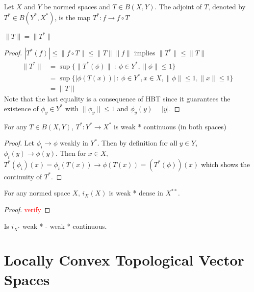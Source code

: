 
\begin{definition}
  Let $X$ and $Y$ be normed spaces and $T \in B(X, Y)$. The adjoint
  of $T$, denoted by $T^{*} \in B(Y^{*}, X^{*})$, is the map $T^{*}:
  f \to f\circ T$
\end{definition}

\begin{proposition}
  $\|T\| = \|T^*\|$
\end{proposition}
\begin{proof}
  $|T^*(f)| \le \|f \circ T\| \le \|T\|\|f\|$ implies $ \|T^{*}\| \le \|T\|$
  \begin{align*}
    \|T^*\| & = \sup \{ \|T^{*}(\phi)\| \ : \ \phi \in Y^*, \|\phi\| \le 1 \} \\
    &= \sup \{ |\phi(T(x))| \ : \ \phi \in Y^*, x \in X, \|\phi\| \le
    1, \|x\| \le 1 \} \\
    &= \|T\|
  \end{align*}
  Note that the last equality is a consequence of HBT since it
  guarantees the existence of $\phi_y \in Y^*$ with $\|\phi_y\|\le 1$
  and $\phi_y(y) = |y|$.
\end{proof}

\begin{lemma}
  For any $T \in B(X, Y)$, $T^*: Y^* \to X^*$ is weak * continuous
  (in both spaces)
\end{lemma}
\begin{proof}
  Let $\phi_i \to \phi$ weakly in $Y^*$. Then by definition for all
  $y \in Y$, $\phi_i(y) \to \phi(y)$. Then for $x \in X$,
  $T^*(\phi_i)(x) = \phi_i(T(x)) \to \phi(T(x)) = (T^*(\phi))(x)$
  which shows the continuity of $T^*$.
\end{proof}

\begin{lemma}
  For any normed space $X$, $i_X(X)$ is weak * dense in $X^{**}$.
\end{lemma}
\begin{proof}
  \textcolor{red}{verify}
\end{proof}

\begin{example}
  Is $i_{X^*}$ weak * - weak * continuous.
\end{example}

\section{Locally Convex Topological Vector Spaces}

